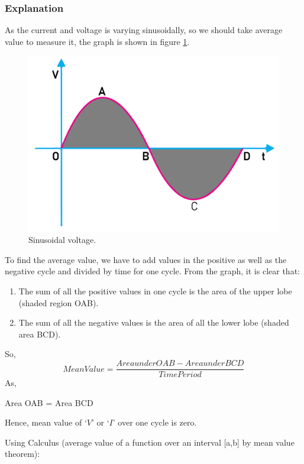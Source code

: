 \subsubsection{Explanation}
As the current and voltage is varying sinusoidally, so we should take
average value to measure it, the graph is shown in figure \ref{fig:15.5}.
\begin{figure}[H]
    \centering
    \includegraphics[scale = 0.6]{Images/Chapter-15/15.5}
    \caption{Sinusoidal voltage.}
    \label{fig:15.5}
\end{figure}
To find the average value, we have to add values in the positive as
well as the negative cycle and divided by time for one cycle.
From the graph, it is clear that:
\begin{enumerate}[label = (\roman*)]
    \item The sum of all the positive values in one cycle is the area
    of the upper lobe (shaded region OAB).
    \item The sum of all the negative values is the area of all the
    lower lobe (shaded area BCD).
\end{enumerate}
So,
\begin{equation}
    Mean Value = \frac{Area under OAB - Area under BCD }{Time Period}
\end{equation}
As,
\begin{center}
    Area OAB = Area BCD
\end{center}
Hence, mean value of ‘$V$’ or ‘$I$’ over one cycle is zero.

Using Calculus (average value of a function over an interval [a,b]
by mean value theorem):

